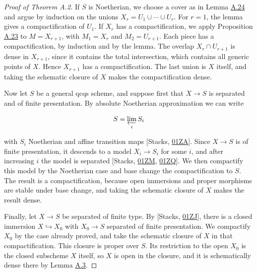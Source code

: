 \documentclass[11pt]{article}
\begin{document}
\begin{proof}[{Proof of Theorem A.2}]\label{bp68}%
If \(S\) is Noetherian, we choose a cover as in Lemma \hyperref[bp65]{A.24} and argue by induction on the unions \(X_r=U_1\cup\cdots\cup U_r\). For \(r=1\), the lemma gives a compactification of \(U_1\). If \(X_r\) has a compactification, we apply Proposition \hyperref[bp61]{A.23} to \(M=X_{r+1}\), with \(M_1=X_r\) and \(M_2=U_{r+1}\). Each piece has a compactification, by induction and by the lemma. The overlap \(X_r\cap U_{r+1}\) is dense in \(X_{r+1}\), since it contains the total intersection, which contains all generic points of \(X\). Hence \(X_{r+1}\) has a compactification. The last union is \(X\) itself, and taking the schematic closure of \(X\) makes the compactification dense.

Now let \(S\) be a general qcqs scheme, and suppose first that \(X\to S\) is separated and of finite presentation. By absolute Noetherian approximation we can write

\[
S=\varprojlim_i S_i
\]

with \(S_i\) Noetherian and affine transition maps [Stacks, \href{https://stacks.math.columbia.edu/tag/01ZA}{01ZA}]. Since \(X\to S\) is of finite presentation, it descends to a model \(X_i\to S_i\) for some \(i\), and after increasing \(i\) the model is separated [Stacks, \href{https://stacks.math.columbia.edu/tag/01ZM}{01ZM}, \href{https://stacks.math.columbia.edu/tag/01ZQ}{01ZQ}]. We then compactify this model by the Noetherian case and base change the compactification to \(S\). The result is a compactification, because open immersions and proper morphisms are stable under base change, and taking the schematic closure of \(X\) makes the result dense.

Finally, let \(X\to S\) be separated of finite type. By [Stacks, \href{https://stacks.math.columbia.edu/tag/01ZJ}{01ZJ}], there is a closed immersion \(X\hookrightarrow X_0\) with \(X_0\to S\) separated of finite presentation. We compactify \(X_0\) by the case already proved, and take the schematic closure of \(X\) in that compactification. This closure is proper over \(S\). Its restriction to the open \(X_0\) is the closed subscheme \(X\) itself, so \(X\) is open in the closure, and it is schematically dense there by Lemma \hyperref[bp9]{A.3}.
\end{proof}


\end{document}
